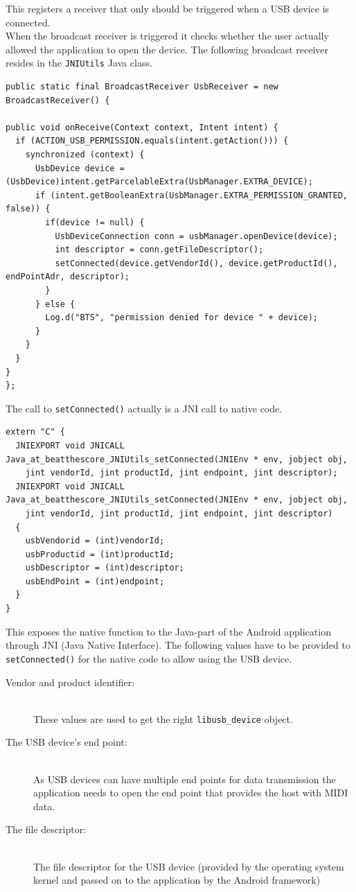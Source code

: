 This registers a receiver that only should be triggered when a USB device is connected.
\\
When the broadcast receiver is triggered it checks whether the user actually allowed the application to open the device. The following broadcast receiver resides in the {\tt JNIUtils} Java class.
\begin{lstlisting}
public static final BroadcastReceiver UsbReceiver = new BroadcastReceiver() {

public void onReceive(Context context, Intent intent) {
  if (ACTION_USB_PERMISSION.equals(intent.getAction())) {
    synchronized (context) {
      UsbDevice device = (UsbDevice)intent.getParcelableExtra(UsbManager.EXTRA_DEVICE);
	  if (intent.getBooleanExtra(UsbManager.EXTRA_PERMISSION_GRANTED, false)) {
        if(device != null) {
          UsbDeviceConnection conn = usbManager.openDevice(device);
          int descriptor = conn.getFileDescriptor();
          setConnected(device.getVendorId(), device.getProductId(), endPointAdr, descriptor);
        }
      } else {
        Log.d("BTS", "permission denied for device " + device);
      }
    }
  }
}
};
\end{lstlisting}

The call to {\tt setConnected()} actually is a JNI call to native code.

\begin{lstlisting}
extern "C" {
  JNIEXPORT void JNICALL Java_at_beatthescore_JNIUtils_setConnected(JNIEnv * env, jobject obj,
    jint vendorId, jint productId, jint endpoint, jint descriptor);
  JNIEXPORT void JNICALL Java_at_beatthescore_JNIUtils_setConnected(JNIEnv * env, jobject obj,
    jint vendorId, jint productId, jint endpoint, jint descriptor)
  {
    usbVendorid = (int)vendorId;
    usbProductid = (int)productId;
    usbDescriptor = (int)descriptor;
    usbEndPoint = (int)endpoint;
  }
}

\end{lstlisting}
This exposes the native \cpp function to the Java-part of the Android application through JNI (Java Native Interface). 
The following values have to be provided to {\tt setConnected()} for the native code to allow using the USB device.

\begin{description}
\item[Vendor and product identifier:] \hfill \\ These values are used to get the right {\tt libusb\_device} object.
\item[The USB device's end point:] \hfill \\ As USB devices can have multiple end points for data transmission the application needs to open the end point that provides the host with MIDI data.
\item[The file descriptor:] \hfill \\ The file descriptor for the USB device (provided by the operating system kernel and passed on to the application by the Android framework)
\end{description}

